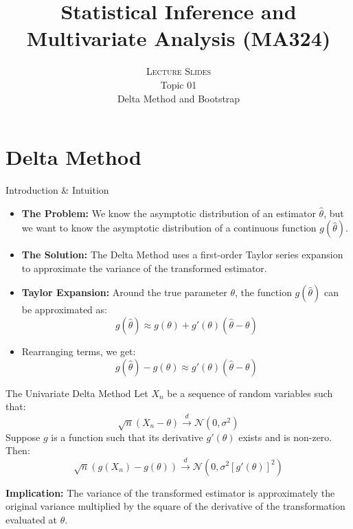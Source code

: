 \documentclass[
  ignorenonframetext,
]{beamer}
\date{\text{Jan - May, 2026}}
\title[SIMA]{ Statistical Inference and Multivariate Analysis (MA324) }
\subtitle{ \textsc{Lecture Slides} \\ Topic 01 \\ Delta Method and Bootstrap }
\author{}
\date{}
\providecommand{\tightlist}{%
  \setlength{\itemsep}{0pt}\setlength{\parskip}{0pt}}
\begin{document}
\begin{frame}[plain]{}
\label{section}
\titlepage
\end{frame}

\section{Delta Method}\label{delta-method}

\begin{frame}{Introduction \& Intuition}
\label{introduction-intuition}
\begin{itemize}
\tightlist
\item
  \textbf{The Problem:} We know the asymptotic distribution of an
  estimator \(\hat{\theta}\), but we want to know the asymptotic
  distribution of a continuous function \(g(\hat{\theta})\).
\item
  \textbf{The Solution:} The Delta Method uses a first-order Taylor
  series expansion to approximate the variance of the transformed
  estimator.
\item
  \textbf{Taylor Expansion:} Around the true parameter \(\theta\), the
  function \(g(\hat{\theta})\) can be approximated as:
  \[g(\hat{\theta}) \approx g(\theta) + g'(\theta)(\hat{\theta} - \theta)\]
\item
  Rearranging terms, we get:
  \[g(\hat{\theta}) - g(\theta) \approx g'(\theta)(\hat{\theta} - \theta)\]
\end{itemize}
\end{frame}

\begin{frame}{The Univariate Delta Method}
\label{the-univariate-delta-method}
Let \(X_n\) be a sequence of random variables such that:
\[\sqrt{n}(X_n - \theta) \xrightarrow{d} \mathcal{N}(0, \sigma^2)\]
Suppose \(g\) is a function such that its derivative \(g'(\theta)\)
exists and is non-zero. Then:
\[\sqrt{n}(g(X_n) - g(\theta)) \xrightarrow{d} \mathcal{N}\left(0, \sigma^2 \left[g'(\theta)\right]^2\right)\]

\vspace{0.5cm}

\textbf{Implication:} The variance of the transformed estimator is
approximately the original variance multiplied by the square of the
derivative of the transformation evaluated at \(\theta\).
\end{frame}
\end{document}
